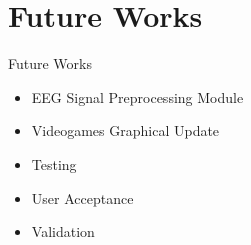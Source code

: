 \section{Future Works}
\begin{frame}{Future Works}
\begin{itemize}
    \item EEG Signal Preprocessing Module
    \item Videogames Graphical Update
    \item Testing
    \item User Acceptance
    \item Validation
\end{itemize}
\end{frame}